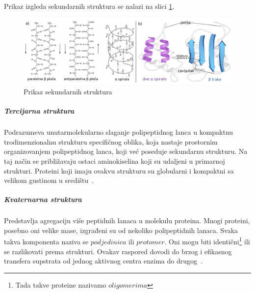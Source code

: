 Prikaz izgleda sekundarnih struktura se nalazi na slici \ref{fig:ab}.
\begin{figure}[h]
	\centering
    \includegraphics[width=1\textwidth]{Figures/BO/sec_structure.png}
    \caption{Prikaz sekundarnih struktura~\cite{Vinterhalter}}
    \label{fig:ab}
\end{figure}
 

\subparagraph{Tercijarna struktura}
Podrazumeva unutarmolekularno slaganje polipeptidnog lanca u kompaktnu trodimenzionalnu strukturu specifičnog oblika, koja nastaje prostornim organizovanjem polipeptidnog lanca, koji već poseduje sekundarnu strukturu. Na taj način se približavaju ostaci aminokiselina koji su udaljeni u primarnoj strukturi. Proteini koji imaju ovakvu strukturu su globularni i kompaktni sa velikom gustinom u središtu~\cite{spasic,medbio}.
\subparagraph{Kvaternarna struktura}
Predstavlja agregaciju više peptidnih lanaca u molekulu proteina. Mnogi proteini, posebno oni velike mase, izgrađeni su od nekoliko polipeptidnih lanaca. Svaka takva komponenta naziva se $podjedinica$ ili $protomer$. Oni mogu biti identični\footnote{Tada takve proteine nazivamo $oligomerima$} ili se razlikovati prema strukturi. Ovakav raspored dovodi do brzog i efikasnog transfera supstrata od jednog aktivnog centra enzima do drugog~\cite{spasic,medbio}.
 
